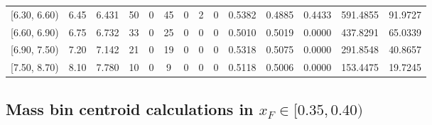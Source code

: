 \begin{table}[htbp]
{\begin{tabular}{cc|c|cccccc|ccc|cc}
        {[6.30, 6.60)} & 6.45 & 6.431 & 50 & 0 & 45 & 0 & 2 & 0 & 0.5382 & 0.4885 & 0.4433 & 591.4855 & 91.9727 \\
        {[6.60, 6.90)} & 6.75 & 6.732 & 33 & 0 & 25 & 0 & 0 & 0 & 0.5010 & 0.5019 & 0.0000 & 437.8291 & 65.0339 \\
        {[6.90, 7.50)} & 7.20 & 7.142 & 21 & 0 & 19 & 0 & 0 & 0 & 0.5318 & 0.5075 & 0.0000 & 291.8548 & 40.8657 \\
        {[7.50, 8.70)} & 8.10 & 7.780 & 10 & 0 & 9 & 0 & 0 & 0 & 0.5118 & 0.5006 & 0.0000 & 153.4475 & 19.7245 \\
        \hline\hline
    \end{tabular}
    }
\end{table}

\clearpage
\subsection{\texorpdfstring{Mass bin centroid calculations in $x_F \in [0.35, 0.40)$}{Mass bin centroid calculations in x\_F in [0.35, 0.40)]}}

